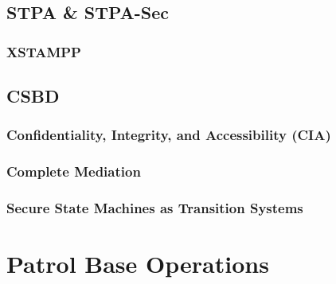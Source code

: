 \documentclass[../../main/main.tex]{subfiles}
\begin{document}
\subsection{STPA \& STPA-Sec}\label{ssec:stpa}

\subsubsection{XSTAMPP}\label{sssec:xstamp}


\subsection{CSBD}\label{ssec:csbd}


\subsubsection{Confidentiality, Integrity, and Accessibility (CIA) }\label{sssect:ssmts}


\subsubsection{Complete Mediation}\label{sssec:strommediate}

\subsubsection{Secure State Machines as Transition Systems }\label{sssect:ssmts}

\section{Patrol Base Operations}\label{sec:stormpb}
\end{document}

